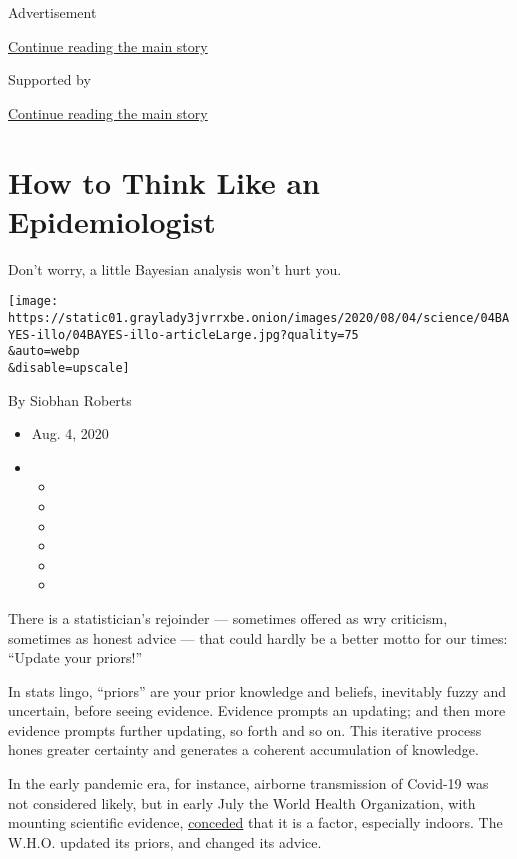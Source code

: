 Advertisement

\protect\hyperlink{after-top}{Continue reading the main story}

Supported by

\protect\hyperlink{after-sponsor}{Continue reading the main story}

\hypertarget{how-to-think-like-an-epidemiologist}{%
\section{How to Think Like an
Epidemiologist}\label{how-to-think-like-an-epidemiologist}}

Don't worry, a little Bayesian analysis won't hurt you.

\texttt{[image: https://static01.graylady3jvrrxbe.onion/images/2020/08/04/science/04BAYES-illo/04BAYES-illo-articleLarge.jpg?quality=75\\\&auto=webp\\\&disable=upscale]}

By Siobhan Roberts

\begin{itemize}
\item
  Aug. 4, 2020
\item
  \begin{itemize}
  \item
  \item
  \item
  \item
  \item
  \item
  \end{itemize}
\end{itemize}

There is a statistician's rejoinder --- sometimes offered as wry
criticism, sometimes as honest advice --- that could hardly be a better
motto for our times: ``Update your priors!''

In stats lingo, ``priors'' are your prior knowledge and beliefs,
inevitably fuzzy and uncertain, before seeing evidence. Evidence prompts
an updating; and then more evidence prompts further updating, so forth
and so on. This iterative process hones greater certainty and generates
a coherent accumulation of knowledge.

In the early pandemic era, for instance, airborne transmission of
Covid-19 was not considered likely, but in early July the World Health
Organization, with mounting scientific evidence,
\href{https://www.nytimes3xbfgragh.onion/2020/07/30/opinion/coronavirus-aerosols.html?surface=most-popular\&fellback=false\&req_id=877412152\&algo=top_conversion\&imp_id=115726583\&action=click\&module=Most\%20Popular\&pgtype=Homepage}{conceded}
that it is a factor, especially indoors. The W.H.O. updated its priors,
and changed its advice.

